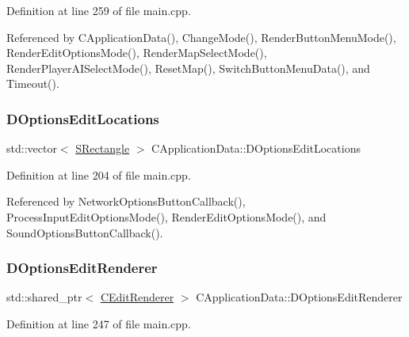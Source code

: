 Definition at line 259 of file main.\+cpp.



Referenced by C\+Application\+Data(), Change\+Mode(), Render\+Button\+Menu\+Mode(), Render\+Edit\+Options\+Mode(), Render\+Map\+Select\+Mode(), Render\+Player\+A\+I\+Select\+Mode(), Reset\+Map(), Switch\+Button\+Menu\+Data(), and Timeout().

\hypertarget{classCApplicationData_ab4e6804c6e50cca45ab3c3071588da34}{}\label{classCApplicationData_ab4e6804c6e50cca45ab3c3071588da34} 
\subsubsection{\texorpdfstring{D\+Options\+Edit\+Locations}{DOptionsEditLocations}}
{\footnotesize\ttfamily std\+::vector$<$ \hyperlink{structSRectangle}{S\+Rectangle} $>$ C\+Application\+Data\+::\+D\+Options\+Edit\+Locations\hspace{0.3cm}{\ttfamily [protected]}}



Definition at line 204 of file main.\+cpp.



Referenced by Network\+Options\+Button\+Callback(), Process\+Input\+Edit\+Options\+Mode(), Render\+Edit\+Options\+Mode(), and Sound\+Options\+Button\+Callback().

\hypertarget{classCApplicationData_ad445b9a4d742414d09196de7cd8a5b26}{}\label{classCApplicationData_ad445b9a4d742414d09196de7cd8a5b26} 
\subsubsection{\texorpdfstring{D\+Options\+Edit\+Renderer}{DOptionsEditRenderer}}
{\footnotesize\ttfamily std\+::shared\+\_\+ptr$<$ \hyperlink{classCEditRenderer}{C\+Edit\+Renderer} $>$ C\+Application\+Data\+::\+D\+Options\+Edit\+Renderer\hspace{0.3cm}{\ttfamily [protected]}}



Definition at line 247 of file main.\+cpp.



